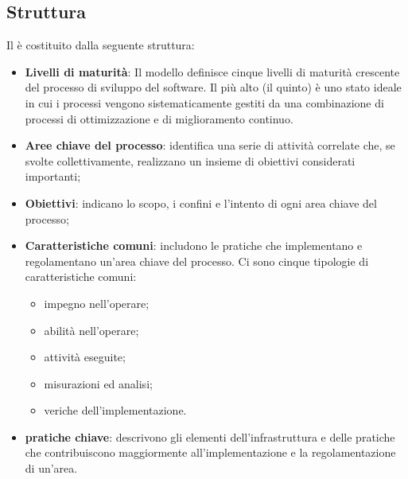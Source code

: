 \documentclass[PianoDiQualifica.tex]{subfiles}
\begin{document}
	\subsection{Struttura}
	Il  è costituito dalla seguente struttura:
	\begin{itemize}
		\item \textbf{Livelli di maturità}: Il modello definisce cinque livelli di maturità crescente del processo di sviluppo del software. Il più alto (il quinto) è uno stato ideale in cui i processi vengono sistematicamente
		gestiti da una combinazione di processi di ottimizzazione e di miglioramento continuo. 
		\item \textbf{Aree chiave del processo}: identifica una serie di attività correlate che, se svolte collettivamente,
		realizzano un insieme di obiettivi considerati importanti;
		\item \textbf{Obiettivi}: indicano lo scopo, i confini e l'intento di ogni area chiave del processo;
		\item \textbf{Caratteristiche comuni}: includono le pratiche che implementano e regolamentano un'area chiave del processo. Ci sono cinque
		tipologie di caratteristiche comuni:
		\begin{itemize}
			\item impegno nell'operare;
			\item abilità nell'operare;
			\item attività eseguite;
			\item misurazioni ed analisi;
			\item veriche dell'implementazione.
		\end{itemize}
		\item \textbf{pratiche chiave}: descrivono gli elementi dell'infrastruttura e delle pratiche che contribuiscono maggiormente all'implementazione
		e la regolamentazione di un'area.
	\end{itemize}
	
\end{document}
